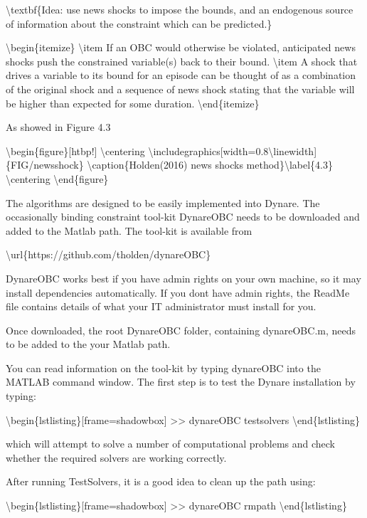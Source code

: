 \documentclass[10pt,math=newtx,citestyle=gb7714-2015,bibstyle=gb7714-2015]{elegantbook}
\begin{document}
	\textbackslash{}textbf\{Idea: use news shocks to impose the bounds, and an endogenous source of information about the constraint which can be predicted.\}
	
	\textbackslash{}begin\{itemize\}
	\textbackslash{}item If an OBC would otherwise be violated, anticipated news shocks push the constrained variable(s) back to their bound.
	\textbackslash{}item A shock that drives a variable to its bound for an episode can be thought of as a combination of the original shock and a sequence of news shock stating that the variable will be higher than expected for some duration.
	\textbackslash{}end\{itemize\}
	
	As showed in Figure 4.3
	
	\textbackslash{}begin\{figure\}[htbp!]
	\textbackslash{}centering
	\textbackslash{}includegraphics[width=0.8\textbackslash{}linewidth]\{FIG/newsshock\}
	\textbackslash{}caption\{Holden(2016) news shocks method\}\textbackslash{}label\{4.3\}
	\textbackslash{}centering
	\textbackslash{}end\{figure\}
	
	The algorithms are designed to be easily implemented into Dynare. The occasionally binding constraint tool-kit DynareOBC needs to be downloaded and added to the Matlab path. The tool-kit is available from
	
	\textbackslash{}url\{https://github.com/tholden/dynareOBC\}
	
	DynareOBC works best if you have admin rights on your own machine, so it may install dependencies automatically. If you dont have admin rights, the ReadMe file contains details of what your IT administrator must install for you.
	
	Once downloaded, the root DynareOBC folder, containing dynareOBC.m, needs to be added to the your Matlab path.
	
	You can read information on the tool-kit by typing dynareOBC into the MATLAB command window. The first step is to test the Dynare installation by typing:
	
	\textbackslash{}begin\{lstlisting\}[frame=shadowbox]
	>> dynareOBC testsolvers
	\textbackslash{}end\{lstlisting\}
	
	which will attempt to solve a number of computational problems and check whether the required solvers are working correctly.
	
	After running TestSolvers, it is a good idea to clean up the path using:
	
	\textbackslash{}begin\{lstlisting\}[frame=shadowbox]
	>> dynareOBC rmpath
	\textbackslash{}end\{lstlisting\}
	
\end{document}
